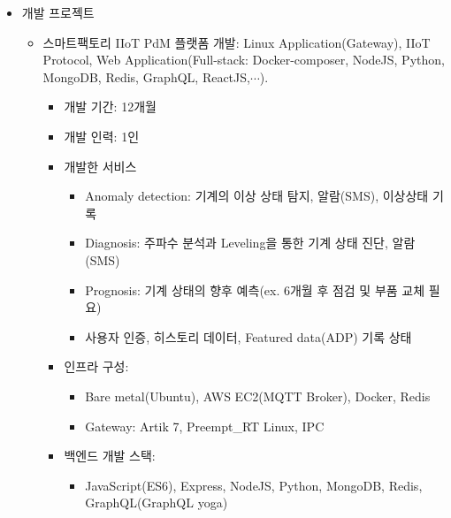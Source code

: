 \begin{itemize}[label=]
\begin{itemize}[label=]
{\begin{minipage}{1.65\textwidth}
			\end{minipage}
		}
\end{itemize}



\divider


\begin{itemize}[label=]
	\item 개발 프로젝트
	      \begin{itemize}[label=]
		      \item 스마트팩토리 IIoT PdM 플랫폼 개발: Linux Application(Gateway), IIoT Protocol, Web Application(Full-stack: Docker-composer, NodeJS, Python, MongoDB, Redis, GraphQL, ReactJS,$\cdots$).\hyperref[pdmplatform]{\space {}}
		            \begin{itemize}[label=]
			            \item 개발 기간: 12개월
			            \item 개발 인력: 1인
			            \item 개발한 서비스
			                  \begin{itemize}
				                  \item Anomaly detection: 기계의 이상 상태 탐지, 알람(SMS), 이상상태 기록
				                  \item Diagnosis: 주파수 분석과 Leveling을 통한 기계 상태 진단, 알람(SMS)
				                  \item Prognosis: 기계 상태의 향후 예측(ex. 6개월 후 점검 및 부품 교체 필요)
				                  \item 사용자 인증, 히스토리 데이터, Featured data(ADP) 기록 상태
			                  \end{itemize}
			            \item 인프라 구성:
			                  \begin{itemize}
				                  \item Bare metal(Ubuntu), AWS EC2(MQTT Broker), Docker, Redis
				                  \item Gateway: Artik 7, Preempt\_RT Linux, IPC
			                  \end{itemize}
			            \item 백엔드 개발 스택:
			                  \begin{itemize}
				                  \item JavaScript(ES6), Express, NodeJS, Python, MongoDB, Redis, GraphQL(GraphQL yoga)

\end{itemize}
\end{itemize}
\end{itemize}
\end{itemize}
\end{itemize}
